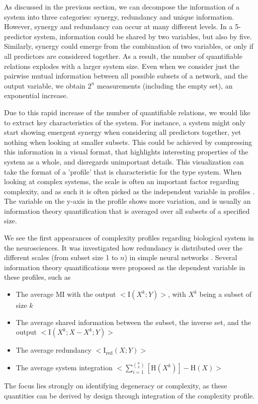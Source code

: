 \documentclass[../main.tex]{subfiles}
\begin{document}
As discussed in the previous section, we can decompose the information of a system into three categories: synergy, redundancy and unique information.
However, synergy and redundancy can occur at many different levels.
In a 5-predictor system, information could be shared by two variables, but also by five.
Similarly, synergy could emerge from the combination of two variables, or only if all predictors are considered together.
As a result, the number of quantifiable relations explodes with a larger system size.
Even when we consider just the pairwise mutual information between all possible subsets of a network, and the output variable, we obtain $2^n$ measurements (including the empty set), an exponential increase.

Due to this rapid increase of the number of quantifiable relations, we would like to extract key characteristics of the system.
For instance, a system might only start showing emergent synergy when considering all predictors together, yet nothing when looking at smaller subsets.
This could be achieved by compressing this information in a visual format, that highlights interesting properties of the system as a whole, and disregards unimportant details.
This visualization can take the format of a 'profile' that is characteristic for the type system.
When looking at complex systems, the scale is often an important factor regarding complexity, and as such it is often picked as the independent variable in profiles \cite{bar2013computationally, quax2017quantifying, tononi1999measures}.
The variable on the y-axis in the profile shows more variation, and is usually an information theory quantification that is averaged over all subsets of a specified size.

We see the first appearances of complexity profiles regarding biological system in the neurosciences.
It was investigated how redundancy is distributed over the different scales (from subset size 1 to $n$) in simple neural networks \cite{tononi1999measures}.
Several information theory quantifications were proposed as the dependent variable in these profiles, such as
%
\begin{itemize}
\item The average MI with the output $<\mathrm{I}\left( X^k;Y \right) >$, with $X^k$ being a subset of size $k$
\item The average shared information between the subset, the inverse set, and the output  $<\mathrm{I}\left( X^k;X - X^k;Y\right) >$
\item The average redundancy $<\mathrm{I}_\mathrm{red}\left( X;Y\right) >$
\item The average system integration $<\sum_{i = 1}^{\binom{n}{k}}[\mathrm{H}(X^k)] - \mathrm{H}\left( X\right) >$
\end{itemize}
%
The focus lies strongly on identifying degeneracy or complexity, as these quantities can be derived by design through integration of the complexity profile.
\end{document}
